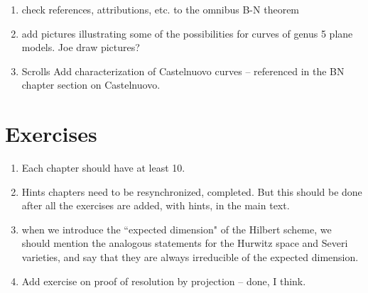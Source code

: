 \documentclass[12pt, leqno]{book}
\begin{document}
\begin{enumerate}
\item {check references, attributions, etc.} to the omnibus B-N theorem


\item add pictures illustrating some of the possibilities for curves of genus 5  plane models. Joe draw pictures?

\item{Scrolls}
Add characterization of Castelnuovo curves -- referenced in the BN chapter section on Castelnuovo.


\end{enumerate}
\section{Exercises}

\begin{enumerate}
\item Each chapter should have at least 10. 
\item Hints chapters need to be resynchronized, completed. But this should be done after all the exercises are added, with
hints, in the main text.

 \item when we introduce the ``expected dimension" of the Hilbert scheme, we should mention the analogous statements for the Hurwitz space and Severi varieties, and say that they are always irreducible of the expected dimension.


\item Add exercise on proof of resolution by projection -- done, I think.

\end{enumerate}
\end{document}
